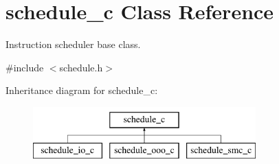\hypertarget{classschedule__c}{
\section{schedule\_\-c Class Reference}
\label{classschedule__c}
}


Instruction scheduler base class.  




{\ttfamily \#include $<$schedule.h$>$}

Inheritance diagram for schedule\_\-c:\begin{figure}[H]
\begin{center}
\leavevmode
\includegraphics[height=2.000000cm]{classschedule__c}
\end{center}
\end{figure}
